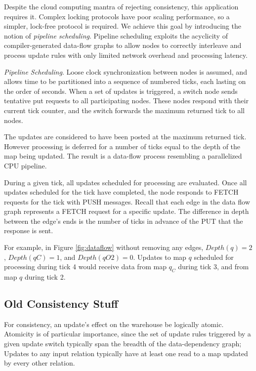 Despite the cloud computing mantra of rejecting consistency, this application requires it.  Complex locking protocols have poor scaling performance, so a simpler, lock-free protocol is required.  We achieve this goal by introducing the notion of \textit{pipeline scheduling}.  Pipeline scheduling exploits the acyclicity of compiler-generated data-flow graphs to allow nodes to correctly interleave and process update rules with only limited network overhead and processing latency.


{\em Pipeline Scheduling}.
Loose clock synchronization between nodes is assumed, and allows time to be partitioned into a sequence of numbered ticks, each lasting on the order of seconds.  When a set of updates is triggered, a switch node sends tentative put requests to all participating nodes.  These nodes respond with their current tick counter, and the switch forwards the maximum returned tick to all nodes.

The updates are considered to have been posted at the maximum returned tick.  However processing is deferred for a number of ticks equal to the depth of the map being updated.  The result is a data-flow process resembling a parallelized CPU pipeline.

During a given tick, all updates scheduled for processing are evaluated.  Once all updates scheduled for the tick have completed, the node responds to FETCH requests for the tick with PUSH messages.  Recall that each edge in the data flow graph represents a FETCH request for a specific update.  The difference in depth between the edge's ends is the number of ticks in advance of the PUT that the response is sent.  

For example, in Figure \ref{fig:dataflow} without removing any edges,
$Depth(q) = 2$, $Depth(qC) = 1$, and $Depth(qO2) = 0$.  Updates to map $q$ scheduled for processing during tick 4 would receive data from map $q_C$ during tick 3, and from map $q$ during tick 2.


\subsection{Old Consistency Stuff}


For consistency, an update's effect on the warehouse be logically atomic.  Atomicity is of particular importance, since the set of update rules triggered by a given update switch typically span the breadth of the data-dependency graph; Updates to any input relation typically have at least one read to a map updated by every other relation.

